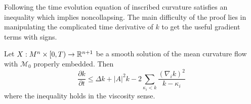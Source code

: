 Following \cite{andrews2022extrinsic,brendle2015sharp} the time evolution equation of inscribed curvature satisfies an inequality which implies noncollapsing. The main difficulty of the proof lies in manipulating the complicated time derivative of $ k $ to get the useful gradient terms with signs. 

\begin{thm}\label{gradnoncollapsing}
    Let $ X : M^{n} \times [0,T) \to \mathbb{R}^{n+1} $ be a smooth solution of the mean curvature flow with $ \mathcal{M}_{0} $ properly embedded. Then \begin{equation}
        \frac{\partial k}{ \partial t} \le \Delta k + |A|^{2}k -2 \sum_{\kappa_{i}<k} \frac{(\nabla_{i}k)^{2}}{k- \kappa_{i}} \label{gradientnoncollapsing}
    \end{equation}
    where the inequality holds in the viscosity sense. 
\end{thm}
\begin{comment}
    Before that we will show that  
\begin{lemma}
    The inscribed curvature satisfies 
    \[ k(x) \ge \lim_{y \to x} \sup k(x,y) = \kappa_{n}(x) \]
    where $ \kappa_{1} \le \ldots \le \kappa_{n} $ denotes the principal curvatures of $ \mathcal{M} $. 
\end{lemma}
\end{comment}
